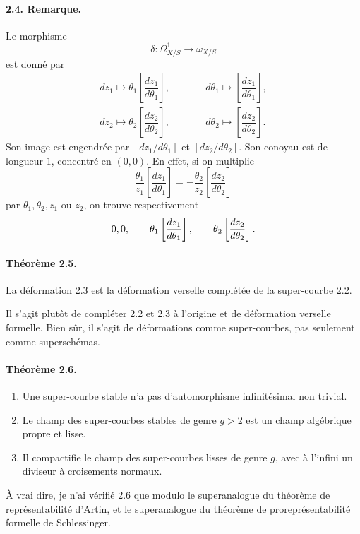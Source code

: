 \documentclass[11pt]{article}
\begin{document}
\paragraph{2.4. Remarque.}
Le morphisme
\[
  \delta:\Omega^1_{X/S}\longrightarrow\omega_{X/S}
\]
est donné par
\[
\begin{array}{lll}
 dz_1\longmapsto \theta_1\left[\dfrac{dz_1}{d\theta_1}\right],
&\qquad& d\theta_1\longmapsto \left[\dfrac{dz_1}{d\theta_1}\right],\\[1.1ex]
 dz_2\longmapsto \theta_2\left[\dfrac{dz_2}{d\theta_2}\right],
&& d\theta_2\longmapsto \left[\dfrac{dz_2}{d\theta_2}\right].
\end{array}
\]
Son image est engendrée par $[dz_1/d\theta_1]$ et $[dz_2/d\theta_2]$. Son conoyau est de longueur $1$, concentré en $(0,0)$. En effet, si on multiplie
\[
  \frac{\theta_1}{z_1}\left[\frac{dz_1}{d\theta_1}\right]
  =-\frac{\theta_2}{z_2}\left[\frac{dz_2}{d\theta_2}\right]
\]
par $\theta_1,\theta_2,z_1$ ou $z_2$, on trouve respectivement
\[
  0,\\[-0.6ex] 0,
  \qquad
  \theta_1\left[\frac{dz_1}{d\theta_1}\right],
  \qquad
  \theta_2\left[\frac{dz_2}{d\theta_2}\right].
\]

\paragraph{Théorème 2.5.}
La déformation 2.3 est la déformation verselle complétée de la super-courbe 2.2.

Il s'agit plutôt de compléter 2.2 et 2.3 à l'origine et de déformation verselle formelle. Bien sûr, il s'agit de déformations comme super-courbes, pas seulement comme superschémas.

\paragraph{Théorème 2.6.}
\begin{enumerate}[label=(\roman*)]
\item Une super-courbe stable n'a pas d'automorphisme infinitésimal non trivial.
\item Le champ des super-courbes stables de genre $g>2$ est un champ algébrique propre et lisse.
\item Il compactifie le champ des super-courbes lisses de genre $g$, avec à l'infini un diviseur à croisements normaux.
\end{enumerate}

À vrai dire, je n'ai vérifié 2.6 que modulo le superanalogue du théorème de représentabilité d'Artin, et le superanalogue du théorème de proreprésentabilité formelle de Schlessinger.
\end{document}
